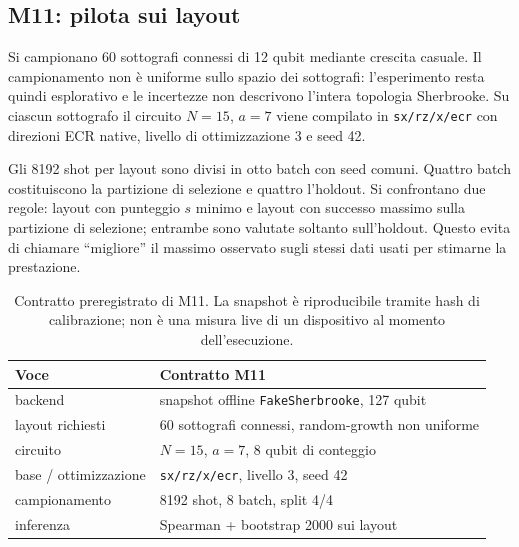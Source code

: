 \begin{onehalfspace}
\subsection{M11: pilota sui layout}
\label{sec:app_comp_pilota}

Si campionano 60 sottografi connessi di 12 qubit mediante crescita casuale. Il campionamento non \`e uniforme sullo spazio dei sottografi: l'esperimento resta quindi esplorativo e le incertezze non descrivono l'intera topologia Sherbrooke. Su ciascun sottografo il circuito $N=15$, $a=7$ viene compilato in \texttt{sx/rz/x/ecr} con direzioni ECR native, livello di ottimizzazione 3 e seed 42.

Gli 8192 shot per layout sono divisi in otto batch con seed comuni. Quattro batch costituiscono la partizione di selezione e quattro l'holdout. Si confrontano due regole: layout con punteggio $s$ minimo e layout con successo massimo sulla partizione di selezione; entrambe sono valutate soltanto sull'holdout. Questo evita di chiamare ``migliore'' il massimo osservato sugli stessi dati usati per stimarne la prestazione.

\begin{table}[H]

\centering
\small
\begin{tabular}{ll}
\toprule
\textbf{Voce} & \textbf{Contratto M11} \\
\midrule
backend & snapshot offline \texttt{FakeSherbrooke}, 127 qubit \\
\addlinespace[0.3em]
layout richiesti & 60 sottografi connessi, random-growth non uniforme \\
\addlinespace[0.3em]
circuito & $N=15$, $a=7$, 8 qubit di conteggio \\
\addlinespace[0.3em]
base / ottimizzazione & \texttt{sx/rz/x/ecr}, livello 3, seed 42 \\
\addlinespace[0.3em]
campionamento & 8192 shot, 8 batch, split 4/4 \\
\addlinespace[0.3em]
inferenza & Spearman + bootstrap 2000 sui layout \\
\bottomrule
\end{tabular}
\caption[Disegno del pilota sui layout]{Contratto preregistrato di M11. La snapshot \`e riproducibile tramite hash di calibrazione; non \`e una misura live di un dispositivo al momento dell'esecuzione.}\label{tab:app_comp_pilota}

\end{table}

\begin{table}[H]


\end{table}
\end{onehalfspace}
